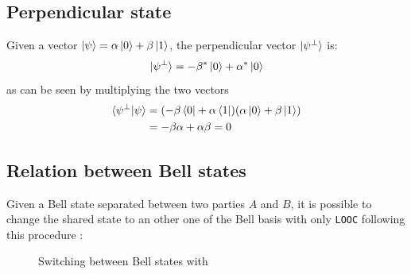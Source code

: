 \documentclass{article}
\begin{document}
\subsection{Perpendicular state}
Given a vector $\ket{\psi} = \alpha \ket{0} + \beta \ket{1}$, the perpendicular vector
$\ket{\psi^\perp}$ is:
\begin{equation}
    \ket{\psi^\perp} = -\beta^* \ket{0} + \alpha^* \ket{0}
\end{equation}
as can be seen by multiplying the two vectors
\begin{equation}
    \begin{aligned}
        \braket{\psi^\perp | \psi}
            & = (-\beta\bra{0} + \alpha\bra{1})(\alpha\ket{0}+\beta\ket{1}) \\
            & = -\beta \alpha + \alpha \beta = 0
    \end{aligned}
\end{equation}

\subsection{Relation between Bell states}
Given a Bell state separated between two parties $A$ and $B$, it is possible to
change the shared state to an other one of the Bell basis with only
\texttt{LOOC} following this procedure :

\begin{figure}[h]
    \centering
    \caption{Switching between Bell states with }
\end{figure}
\end{document}
